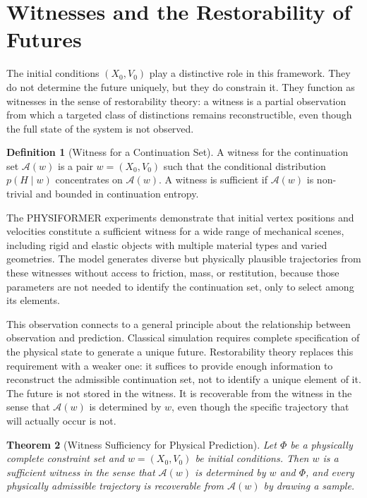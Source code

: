 \documentclass[12pt,oneside]{article}
\newtheorem{theorem}{Theorem}[section]
\theoremstyle{definition}
\newtheorem{definition}[theorem]{Definition}
\newcommand{\A}{\mathcal{A}}
\begin{document}
\section{Witnesses and the Restorability of Futures}

The initial conditions \((X_0, V_0)\) play a distinctive role in this framework. They
do not determine the future uniquely, but they do constrain it. They function as
witnesses in the sense of restorability theory: a witness is a partial observation
from which a targeted class of distinctions remains reconstructible, even though the
full state of the system is not observed.

\begin{definition}[Witness for a Continuation Set]
A witness for the continuation set \(\A(w)\) is a pair \(w = (X_0, V_0)\) such that
the conditional distribution \(p(H \mid w)\) concentrates on \(\A(w)\). A witness
is sufficient if \(\A(w)\) is non-trivial and bounded in continuation entropy.
\end{definition}

The PHYSIFORMER experiments demonstrate that initial vertex positions and velocities
constitute a sufficient witness for a wide range of mechanical scenes, including rigid
and elastic objects with multiple material types and varied geometries. The model
generates diverse but physically plausible trajectories from these witnesses without
access to friction, mass, or restitution, because those parameters are not needed to
identify the continuation set, only to select among its elements.

This observation connects to a general principle about the relationship between
observation and prediction. Classical simulation requires complete specification
of the physical state to generate a unique future. Restorability theory replaces
this requirement with a weaker one: it suffices to provide enough information to
reconstruct the admissible continuation set, not to identify a unique element of it.
The future is not stored in the witness. It is recoverable from the witness in the
sense that \(\A(w)\) is determined by \(w\), even though the specific trajectory
that will actually occur is not.

\begin{theorem}[Witness Sufficiency for Physical Prediction]
Let \(\Phi\) be a physically complete constraint set and \(w = (X_0, V_0)\)
be initial conditions. Then \(w\) is a sufficient witness in the sense that
\(\A(w)\) is determined by \(w\) and \(\Phi\), and every physically
admissible trajectory is recoverable from \(\A(w)\) by drawing a sample.
\end{theorem}
\end{document}
